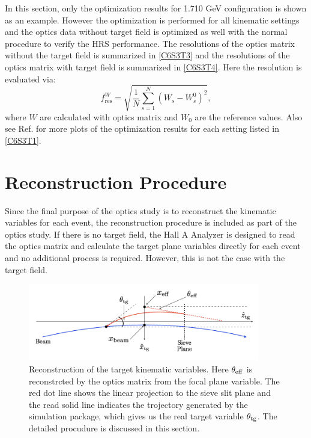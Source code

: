 In this section, only the optimization results for 1.710 GeV configuration is shown as an example. However the optimization is performed for all kinematic settings and the optics data without target field is optimized as well with the normal procedure to verify the HRS performance. The resolutions of the optics matrix without the target field is summarized in \cref{C6S3T3} and the resolutions of the optics matrix with target field is summarized in \cref{C6S3T4}. Here the resolution is evaluated via:
\begin{equation} \label{C6S3E6}
f_{\mathrm{res}}^W = \sqrt{\frac{1}{N}\sum_{s=1}^N(W_s-W_s^0)^2},
\end{equation}
where $W$ are calculated with optics matrix and $W_0$ are the reference values. Also see Ref. \cite{OPTICSWIKI} for more plots of the optimization results for each setting listed in \cref{C6S3T1}.

\section{Reconstruction Procedure}
\label{C6S4}

Since the final purpose of the optics study is to reconstruct the kinematic variables for each event, the reconstruction procedure is included as part of the optics study. If there is no target field, the Hall A Analyzer is designed to read the optics matrix and calculate the target plane variables directly for each event \cite{Hansen2015} and no additional process is required. However, this is not the case with the target field.

\begin{figure}[b!]
  \centering
  \includegraphics[width=0.9\textwidth]{figs/reconstruction.png}
  \caption[Reconstruction of the target kinematic variables.]{Reconstruction of the target kinematic variables. Here $\theta_{\mathrm{eff}}$ is reconstrcted by the optics matrix from the focal plane variable. The red dot line shows the linear projection to the sieve slit plane and the read solid line indicates the trojectory generated by the simulation package, which gives us the real target variable $\theta_{\mathrm{tg}}$. The detailed procudure is discussed in this section.  \label{C6S4F1}}
\end{figure}


